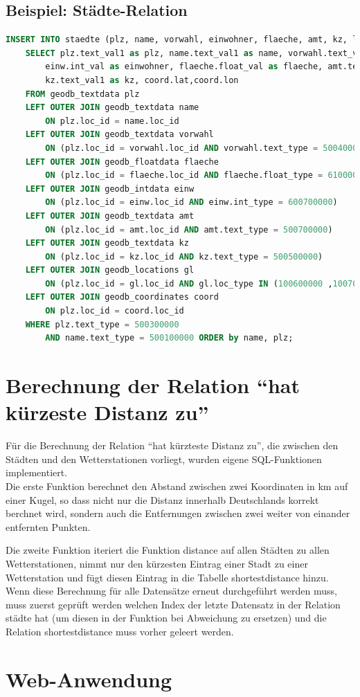 \documentclass[11pt,a4paper,DIV=10,]{scrartcl}
\begin{document}
\subsection*{Beispiel: Städte-Relation}
\begin{lstlisting}[language=sql]
INSERT INTO staedte (plz, name, vorwahl, einwohner, flaeche, amt, kz, lat, lon)
	SELECT plz.text_val1 as plz, name.text_val1 as name, vorwahl.text_val1 as vorwahl,
		einw.int_val as einwohner, flaeche.float_val as flaeche, amt.text_val1 as amt,
		kz.text_val1 as kz, coord.lat,coord.lon
	FROM geodb_textdata plz
	LEFT OUTER JOIN geodb_textdata name 
		ON plz.loc_id = name.loc_id
	LEFT OUTER JOIN geodb_textdata vorwahl 
		ON (plz.loc_id = vorwahl.loc_id AND vorwahl.text_type = 500400000)
	LEFT OUTER JOIN geodb_floatdata flaeche 
		ON (plz.loc_id = flaeche.loc_id AND flaeche.float_type = 610000000)
	LEFT OUTER JOIN geodb_intdata einw 
		ON (plz.loc_id = einw.loc_id AND einw.int_type = 600700000)
	LEFT OUTER JOIN geodb_textdata amt 
		ON (plz.loc_id = amt.loc_id AND amt.text_type = 500700000)
	LEFT OUTER JOIN geodb_textdata kz 
		ON (plz.loc_id = kz.loc_id AND kz.text_type = 500500000)
	LEFT OUTER JOIN geodb_locations gl 
		ON (plz.loc_id = gl.loc_id AND gl.loc_type IN (100600000 ,100700000))
	LEFT OUTER JOIN geodb_coordinates coord 
		ON plz.loc_id = coord.loc_id
	WHERE plz.text_type = 500300000
		AND name.text_type = 500100000 ORDER by name, plz;
\end{lstlisting}

\section{Berechnung der Relation ``hat kürzeste Distanz zu''}
Für die Berechnung der Relation ``hat kürzteste Distanz zu'', die zwischen den Städten und den Wetterstationen vorliegt, 
wurden eigene SQL-Funktionen implementiert.\\
Die erste Funktion berechnet den Abstand zwischen zwei Koordinaten in km auf einer Kugel, so dass nicht nur die Distanz innerhalb Deutschlands korrekt berchnet wird, sondern auch die Entfernungen zwischen zwei weiter von einander entfernten Punkten. 


Die zweite Funktion iteriert die Funktion distance auf allen Städten zu allen Wetterstationen, nimmt nur den kürzesten Eintrag einer Stadt zu einer Wetterstation und fügt diesen Eintrag in die Tabelle shortestdistance hinzu. Wenn diese Berechnung für alle Datensätze erneut durchgeführt werden muss, muss zuerst geprüft werden welchen Index der letzte Datensatz in der Relation städte hat (um diesen in der Funktion bei Abweichung zu ersetzen) und die Relation shortestdistance muss vorher geleert werden. 


\section{Web-Anwendung}



\end{document}
